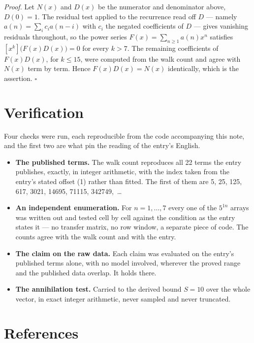 \documentclass[11pt]{article}
\theoremstyle{definition}
\begin{document}
{\itshape Proof.} Let $N(x)$ and $D(x)$ be the numerator and denominator above, $D(0)=1$. The residual test applied to the recurrence read off $D$ --- namely $a(n) = \sum_i c_i a(n-i)$ with $c_i$ the negated coefficients of $D$ --- gives vanishing residuals throughout, so the power series $F(x)=\sum_{n\ge 1}a(n)x^n$ satisfies $[x^k]\bigl(F(x)D(x)\bigr) = 0$ for every $k > 7$. The remaining coefficients of $F(x)D(x)$, for $k \le 15$, were computed from the walk count and agree with $N(x)$ term by term. Hence $F(x)D(x) = N(x)$ identically, which is the assertion. $\square$

\section{Verification}

Four checks were run, each reproducible from the code accompanying this note, and the first two are what pin the reading of the entry's English.

\begin{itemize}

\item {\bfseries The published terms.} The walk count reproduces all 22 terms the entry publishes, exactly, in integer arithmetic, with the index taken from the entry's stated offset (1) rather than fitted. The first of them are 5, 25, 125, 617, 3021, 14695, 71115, 342749,~\dots

\item {\bfseries An independent enumeration.} For $n = 1,\dots,7$ every one of the $5^{1n}$ arrays was written out and tested cell by cell against the condition as the entry states it --- no transfer matrix, no row window, a separate piece of code. The counts agree with the walk count and with the entry.

\item {\bfseries The claim on the raw data.} Each claim was evaluated on the entry's published terms alone, with no model involved, wherever the proved range and the published data overlap. It holds there.

\item {\bfseries The annihilation test.} Carried to the derived bound $S = 10$ over the whole vector, in exact integer arithmetic, never sampled and never truncated.

\end{itemize}

\section{References}
\end{document}
